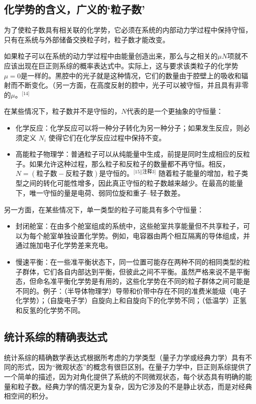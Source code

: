 \subsection{化学势的含义，广义的‘粒子数’}
为了使粒子数具有相关联的化学势，它必须在系统的内部动力学过程中保持守恒，只有在系统与外部储备交换粒子时，粒子数才能改变。

如果粒子可以在系统的动力学过程中由能量创造出来，那么与之相关的\( \mu N \)项就不应该出现在巨正则系综的概率表达式中。实际上，这与要求该类粒子的化学势\( \mu = 0 \)是一样的。黑腔中的光子就是这种情况，它们的数量由于腔壁上的吸收和辐射而不断变化。（另一方面，在高度反射的腔中，光子可以被守恒，并且具有非零的\( \mu \)。\(^\text{[14]}\)

在某些情况下，粒子数并不是守恒的，\( N \)代表的是一个更抽象的守恒量：
\begin{itemize}
\item 化学反应：化学反应可以将一种分子转化为另一种分子；如果发生反应，则必须定义 \( N_i \) 使得它们在化学反应过程中保持不变。
\item 高能粒子物理学：普通粒子可以从纯能量中生成，前提是同时生成相应的反粒子。如果允许这种过程，那么粒子和反粒子的数量都不再守恒。相反，\( N = (\text{粒子数} - \text{反粒子数}) \)是守恒的。\(^\text{[15][注释3]}\) 随着粒子能量的增加，粒子类型之间的转化可能性增多，因此真正守恒的粒子数越来越少。在最高的能量下，唯一守恒的量是电荷、弱同位旋和重子–轻子数差。
\end{itemize}
另一方面，在某些情况下，单一类型的粒子可能具有多个守恒量：
\begin{itemize}
\item 封闭舱室：在由多个舱室组成的系统中，这些舱室共享能量但不共享粒子，可以为每个舱室单独设置化学势。例如，电容器由两个相互隔离的导体组成，并通过施加电子化学势差来充电。
\item 慢速平衡：在一些准平衡状态下，同一位置可能存在两种不同的相同类型的粒子群体，它们各自内部达到平衡，但彼此之间不平衡。虽然严格来说不是平衡态，但命名准平衡化学势是有用的，这些化学势在不同的粒子群体之间可能是不同的。例子：（半导体物理学）导带和价带中存在不同的准费米能级（电子化学势）；（自旋电子学）自旋向上和自旋向下的化学势不同；（低温学）正氢和反氢的化学势不同。
\end{itemize}
\subsection{统计系综的精确表达式}
统计系综的精确数学表达式根据所考虑的力学类型（量子力学或经典力学）具有不同的形式，因为“微观状态”的概念有很巨区别。在量子力学中，巨正则系综提供了一个简单的描述，因为对角化提供了系统的不同微观状态，每个状态具有明确的能量和粒子数。经典力学的情况更为复杂，因为它涉及的不是静止状态，而是对经典相空间的积分。
